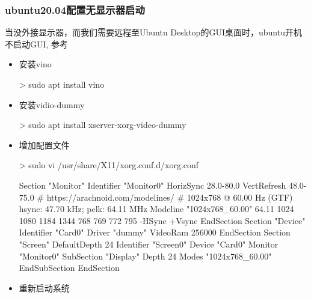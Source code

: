 \subsubsection{ubuntu20.04配置无显示器启动}
当没外接显示器，而我们需要远程至Ubuntu Desktop的GUI桌面时，ubuntu开机不启动GUI, 参考
\begin{itemize}
\item 安装vino
\begin{commandbox}
 > sudo apt install vino
\end{commandbox}

\item 安装vidio-dummy
\begin{commandbox}
 > sudo apt install xserver-xorg-video-dummy
\end{commandbox}

\item 增加配置文件
\begin{commandbox}
 > sudo vi /usr/share/X11/xorg.conf.d/xorg.conf
\end{commandbox}
\begin{messagebox}
Section "Monitor"
  Identifier "Monitor0"
  HorizSync 28.0-80.0
  VertRefresh 48.0-75.0
  # https://arachnoid.com/modelines/
  # 1024x768 @ 60.00 Hz (GTF) hsync: 47.70 kHz; pclk: 64.11 MHz
  Modeline "1024x768_60.00" 64.11 1024 1080 1184 1344 768 769 772 795 -HSync +Vsync
EndSection
Section "Device"
  Identifier "Card0"
  Driver "dummy"
  VideoRam 256000
EndSection
Section "Screen"
  DefaultDepth 24
  Identifier "Screen0"
  Device "Card0"
  Monitor "Monitor0"
  SubSection "Display"
    Depth 24
    Modes "1024x768_60.00"
  EndSubSection
EndSection
\end{messagebox}


\item 重新启动系统

\end{itemize}

